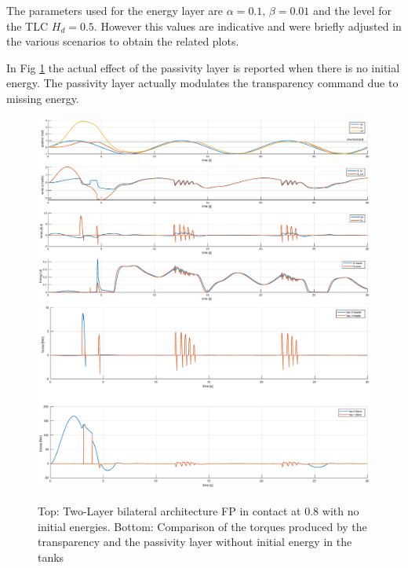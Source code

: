 \documentclass[a4paper,12pt]{article}
\begin{document}
The parameters used for the energy layer are $\alpha = 0.1$, $\beta = 0.01$ and the level for the TLC $H_d = 0.5$. However this values are indicative and were briefly adjusted in the various scenarios to obtain the related plots.
\bigskip

In Fig \ref{fig:energy_pf_no_energy} the actual effect of the passivity layer is reported when there is no initial energy. The passivity layer actually modulates the transparency command due to missing energy.

\begin{figure}[H]
    \hspace*{-4.5cm}
    \includegraphics[scale=0.5]{images/energy_pf_no_energy.eps}
    \qquad
    \hspace*{-1.5cm}
    \includegraphics[scale=0.4]{images/energy_pf_tau.eps}
    \caption{Top: Two-Layer bilateral architecture FP in contact at 0.8 with no initial energies. Bottom: Comparison of the torques produced by the transparency and the passivity layer without initial energy in the tanks}
    \label{fig:energy_pf_no_energy}
\end{figure}
\end{document}
